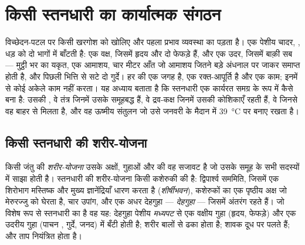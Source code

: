 \chapter{किसी स्तनधारी का कार्यात्मक संगठन}\label{ch:b1:mammal-organization}

विच्छेदन-पटल पर किसी खरगोश को खोलिए और पहला प्रभाव व्यवस्था का पड़ता है।
एक पेशीय चादर, , धड़ को दो भागों में बाँटती है: एक वक्ष, जिसमें
हृदय और दो फेफड़े हैं, और एक उदर, जिसमें बाक़ी सब --- मुट्ठी भर का यकृत,
एक आमाशय, चार मीटर आँत जो आमाशय जितने बड़े अंधनाल पर जाकर समाप्त होती है,
और पिछली भित्ति से सटे दो गुर्दे। हर  की एक जगह है, एक रक्त-आपूर्ति है
और एक काम; इनमें से कोई अकेले काम नहीं करता। यह अध्याय बताता है कि
स्तनधारी एक कार्यरत समग्र के रूप में कैसे बना है: उसकी , वे
तंत्र जिनमें उसके  समूहबद्ध हैं, वे द्रव-कक्ष जिनमें उसकी कोशिकाएँ
रहती हैं, वे  जिनसे वह बाहर से मिलता है, और वह ऊष्मीय संतुलन
जो उसे जनवरी के मैदान में \qty{39}{\celsius} पर बनाए रखता है।

\section{किसी स्तनधारी की शरीर-योजना}

\begin{definition}[शरीर-योजना]\label{def:b1:mammal-organization:bodyplan}
किसी जंतु की \emph{शरीर-योजना} उसके अक्षों, गुहाओं और
 की वह सजावट है जो उसके समूह के सभी सदस्यों में साझा होती है।
स्तनधारी की शरीर-योजना किसी कशेरुकी की है: द्विपार्श्व सममिति, जिसमें एक
शिरोभाग मस्तिष्क और मुख्य ज्ञानेंद्रियाँ धारण करता है
(\emph{शीर्षीभवन}), कशेरुकों का एक पृष्ठीय अक्ष जो
मेरुरज्जु को घेरता है, चार उपांग, और एक अधर देहगुहा ---
\emph{देहगुहा} --- जिसमें अंतरंग  रहते हैं। जो विशेष
रूप से स्तनधारी का है वह यह: देहगुहा पेशीय \emph{मध्यपट}
से एक वक्षीय गुहा (हृदय, फेफड़े) और एक उदरीय गुहा (पाचन , गुर्दे,
जनद) में बँटी होती है; शरीर बालों से ढका होता है; शावक दूध पर पलते हैं;
और ताप नियंत्रित होता है।
\end{definition}

